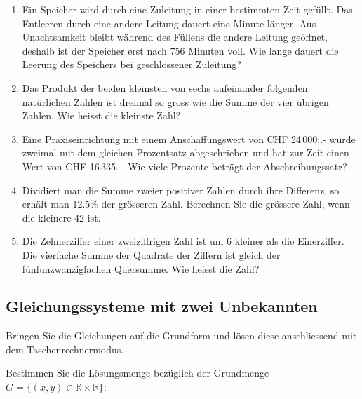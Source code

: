 \begin{enumerate}
  \item Ein Speicher wird durch eine Zuleitung in einer bestimmten
    Zeit gefüllt. Das Entleeren durch eine andere Leitung dauert eine
    Minute länger. Aus Unachtsamkeit bleibt während des Füllens die
    andere Leitung geöffnet, deshalb ist der Speicher erst nach 756
    Minuten voll. Wie lange dauert die Leerung des Speichers bei
    geschlossener Zuleitung?

    \item Das Produkt der beiden kleinsten von sechs aufeinander
      folgenden natürlichen Zahlen ist dreimal so gross wie die Summe
      der vier übrigen Zahlen. Wie heisst die kleinste Zahl?

      \item Eine Praxiseinrichtung mit einem Anschaffungswert von CHF
        24\,000;.- wurde zweimal mit dem gleichen Prozentsatz
        abgeschrieben und hat zur Zeit einen Wert von CHF 16\,335.-.
        Wie viele Prozente beträgt der Abschreibungssatz?

      \item Dividiert man die Summe zweier positiver Zahlen durch ihre
        Differenz, so erhält man 12.5\% der grösseren Zahl.
        Berechnen Sie die grössere Zahl, wenn die kleinere 42 ist.

        \item Die Zehnerziffer einer zweiziffrigen Zahl ist um 6
          kleiner als die Einerziffer. Die vierfache Summe der
          Quadrate der Ziffern ist gleich der fünfunzwanzigfachen
          Quersumme. Wie heisst die Zahl?
\end{enumerate}




\subsection{Gleichungssysteme mit zwei Unbekannten}

  Bringen Sie die Gleichungen auf die Grundform und lösen diese
  anschliessend mit dem Taschenrechnermodus.

  Bestimmen Sie die Lösungsmenge bezüglich der Grundmenge $G = \{(x,
  y) \in \mathbb{R}\times\mathbb{R}\}$;

